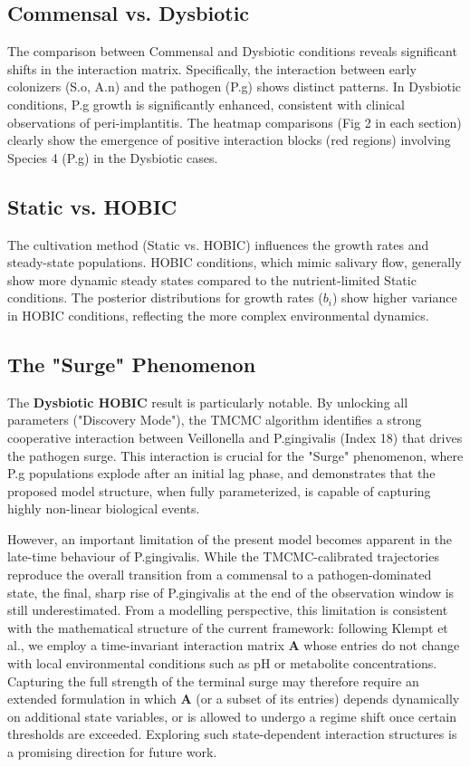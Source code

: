 \documentclass[11pt,a4paper]{article}
\begin{document}
\subsection{Commensal vs. Dysbiotic}
The comparison between Commensal and Dysbiotic conditions reveals significant shifts in the interaction matrix. Specifically, the interaction between early colonizers (S.o, A.n) and the pathogen (P.g) shows distinct patterns. In Dysbiotic conditions, P.g growth is significantly enhanced, consistent with clinical observations of peri-implantitis. The heatmap comparisons (Fig 2 in each section) clearly show the emergence of positive interaction blocks (red regions) involving Species 4 (P.g) in the Dysbiotic cases.

\subsection{Static vs. HOBIC}
The cultivation method (Static vs. HOBIC) influences the growth rates and steady-state populations. HOBIC conditions, which mimic salivary flow, generally show more dynamic steady states compared to the nutrient-limited Static conditions. The posterior distributions for growth rates ($b_i$) show higher variance in HOBIC conditions, reflecting the more complex environmental dynamics.

\subsection{The "Surge" Phenomenon}
The \textbf{Dysbiotic HOBIC} result is particularly notable. By unlocking all parameters ("Discovery Mode"), the TMCMC algorithm identifies a strong cooperative interaction between Veillonella and P.gingivalis (Index 18) that drives the pathogen surge. This interaction is crucial for the "Surge" phenomenon, where P.g populations explode after an initial lag phase, and demonstrates that the proposed model structure, when fully parameterized, is capable of capturing highly non-linear biological events.

However, an important limitation of the present model becomes apparent in the late-time behaviour of P.gingivalis. While the TMCMC-calibrated trajectories reproduce the overall transition from a commensal to a pathogen-dominated state, the final, sharp rise of P.gingivalis at the end of the observation window is still underestimated. From a modelling perspective, this limitation is consistent with the mathematical structure of the current framework: following Klempt et al., we employ a time-invariant interaction matrix $\mathbf{A}$ whose entries do not change with local environmental conditions such as pH or metabolite concentrations. Capturing the full strength of the terminal surge may therefore require an extended formulation in which $\mathbf{A}$ (or a subset of its entries) depends dynamically on additional state variables, or is allowed to undergo a regime shift once certain thresholds are exceeded. Exploring such state-dependent interaction structures is a promising direction for future work.
\end{document}
